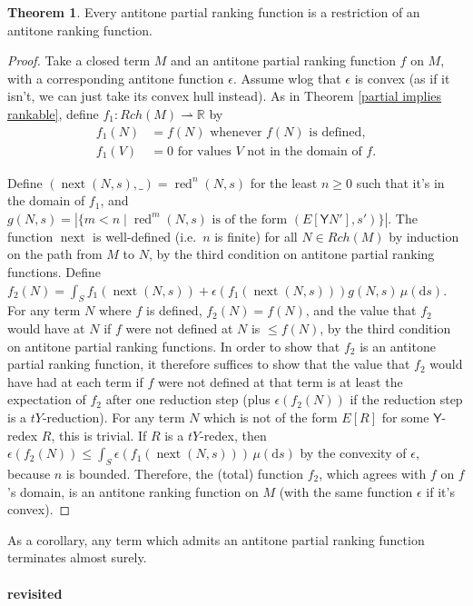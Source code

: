 \documentclass{article}
\newcommand{\tY}{\mathsf{Y}}
\DeclareMathOperator{\red}{red}
\DeclareMathOperator{\nnext}{next}
\theoremstyle{definition}
\theoremstyle{lemma}
\newtheorem{theorem}{Theorem}
\theoremstyle{remark}
\begin{document}
\begin{theorem}
  Every antitone partial ranking function is a restriction of an antitone ranking function.
\end{theorem}
\begin{proof}
  Take a closed term $M$ and an antitone partial ranking function $f$ on $M$, with a corresponding antitone function $\epsilon$. Assume wlog that $\epsilon$ is convex (as if it isn't, we can just take its convex hull instead). As in Theorem \ref{partial implies rankable}, define $f_1 : Rch(M) \rightharpoonup \mathbb R$ by
  \begin{align*}
    f_1(N) &= f(N) \text{ whenever $f(N)$ is defined},\\
    f_1(V) &= 0 \text{ for values $V$ not in the domain of $f$.}
  \end{align*}

  Define $(\nnext(N,s),\_) = \red^n(N,s)$ for the least $n \geq 0$ such that it's in the domain of $f_1$, and $g(N,s) = \left | \{m < n \mid \red^m(N,s) \text{ is of the form } (E[\tY N'],s') \} \right |$. 
  The function $\nnext$ is well-defined (i.e.~$n$ is finite) for all $N \in Rch(M)$ by induction on the path from $M$ to $N$, by the third condition on antitone partial ranking functions. Define $f_2(N) = \int_S f_1(\nnext(N,s)) + \epsilon(f_1(\nnext(N,s))) g(N,s) \, \mu(\mathrm d s)$. For any term $N$ where $f$ is defined, $f_2(N) = f(N)$, and the value that $f_2$ would have at $N$ if $f$ were not defined at $N$ is $\leq f(N)$, by the third condition on antitone partial ranking functions. In order to show that $f_2$ is an antitone partial ranking function, it therefore suffices to show that the value that $f_2$ would have had at each term if $f$ were not defined at that term is at least the expectation of $f_2$ after one reduction step (plus $\epsilon(f_2(N))$ if the reduction step is a $tY$-reduction). For any term $N$ which is not of the form $E[R]$ for some $\tY$-redex $R$, this is trivial. If $R$ is a $tY$-redex, then $\epsilon(f_2(N)) \leq \int_S \epsilon(f_1(\nnext(N,s)))\, \mu(\mathrm d s)$ by the convexity of $\epsilon$, because $n$ is bounded. Therefore, the (total) function $f_2$, which agrees with $f$ on $f$'s domain, is an antitone ranking function on $M$ (with the same function $\epsilon$ if it's convex).
\end{proof}

As a corollary, any term which admits an antitone partial ranking function terminates almost surely.

\paragraph{ revisited}
\end{document}
